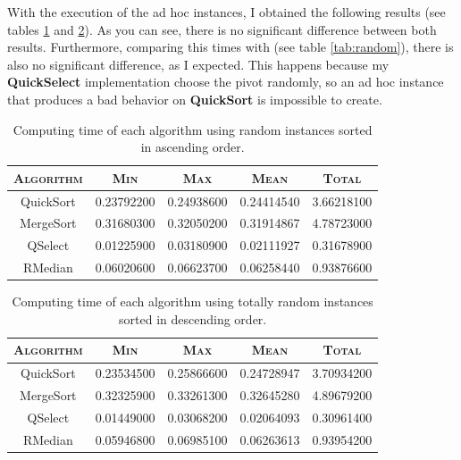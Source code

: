 \documentclass[letterpaper,12pt]{article}
\begin{document}
With the execution of the ad hoc instances, I obtained the following results (see tables \ref{tab:ascending} and \ref{tab:descending}). As you can see, there is no significant difference between both results. Furthermore, comparing this times with (see table \ref{tab:random}), there is also no significant difference, as I expected. This happens because my \textbf{QuickSelect} implementation choose the pivot randomly, so an ad hoc instance that produces a bad behavior on \textbf{QuickSort} is impossible to create. \\

\begin{table}[htbp]
    \centering
    \begin{tabular}{c c c c c}
        \textsc{Algorithm} & \textsc{Min} & \textsc{Max} & \textsc{Mean} & \textsc{Total} \\ \hline
        QuickSort & 0.23792200 & 0.24938600 & 0.24414540 & 3.66218100 \\
        MergeSort & 0.31680300 & 0.32050200 & 0.31914867 & 4.78723000 \\
        QSelect & 0.01225900 & 0.03180900 & 0.02111927 & 0.31678900 \\
        RMedian & 0.06020600 & 0.06623700 & 0.06258440 & 0.93876600 \\
    \end{tabular}
    \caption{Computing time of each algorithm using random instances sorted in ascending order.}
    \label{tab:ascending}
\end{table}

\begin{table}[htbp]
    \centering
    \begin{tabular}{c c c c c}
        \textsc{Algorithm} & \textsc{Min} & \textsc{Max} & \textsc{Mean} & \textsc{Total} \\ \hline
        QuickSort & 0.23534500 & 0.25866600 & 0.24728947 & 3.70934200 \\
        MergeSort & 0.32325900 & 0.33261300 & 0.32645280 & 4.89679200 \\
        QSelect & 0.01449000 & 0.03068200 & 0.02064093 & 0.30961400 \\
        RMedian & 0.05946800 & 0.06985100 & 0.06263613 & 0.93954200 \\
    \end{tabular}
    \caption{Computing time of each algorithm using totally random instances sorted in descending order.}
    \label{tab:descending}
\end{table}
\end{document}
